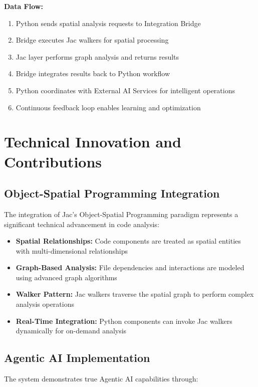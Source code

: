 \documentclass[12pt,a4paper]{article}
\begin{document}
\textbf{Data Flow:}
\begin{enumerate}
    \item Python sends spatial analysis requests to Integration Bridge
    \item Bridge executes Jac walkers for spatial processing
    \item Jac layer performs graph analysis and returns results
    \item Bridge integrates results back to Python workflow
    \item Python coordinates with External AI Services for intelligent operations
    \item Continuous feedback loop enables learning and optimization
\end{enumerate}

\section{Technical Innovation and Contributions}

\subsection{Object-Spatial Programming Integration}

The integration of Jac's Object-Spatial Programming paradigm represents a significant technical advancement in code analysis:

\begin{itemize}
    \item \textbf{Spatial Relationships:} Code components are treated as spatial entities with multi-dimensional relationships
    \item \textbf{Graph-Based Analysis:} File dependencies and interactions are modeled using advanced graph algorithms
    \item \textbf{Walker Pattern:} Jac walkers traverse the spatial graph to perform complex analysis operations
    \item \textbf{Real-Time Integration:} Python components can invoke Jac walkers dynamically for on-demand analysis
\end{itemize}

\subsection{Agentic AI Implementation}

The system demonstrates true Agentic AI capabilities through:
\end{document}
